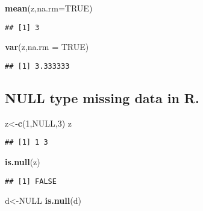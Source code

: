 \documentclass[
]{article}
\newenvironment{Shaded}{\begin{snugshade}}{\end{snugshade}}
\newcommand{\AttributeTok}[1]{\textcolor[rgb]{0.13,0.29,0.53}{#1}}
\newcommand{\ConstantTok}[1]{\textcolor[rgb]{0.56,0.35,0.01}{#1}}
\newcommand{\DecValTok}[1]{\textcolor[rgb]{0.00,0.00,0.81}{#1}}
\newcommand{\FunctionTok}[1]{\textcolor[rgb]{0.13,0.29,0.53}{\textbf{#1}}}
\newcommand{\NormalTok}[1]{#1}
\newcommand{\OtherTok}[1]{\textcolor[rgb]{0.56,0.35,0.01}{#1}}
\begin{document}
\begin{Shaded}
\begin{Highlighting}[]
\FunctionTok{mean}\NormalTok{(z,}\AttributeTok{na.rm=}\ConstantTok{TRUE}\NormalTok{)}
\end{Highlighting}
\end{Shaded}

\begin{verbatim}
## [1] 3
\end{verbatim}

\begin{Shaded}
\begin{Highlighting}[]
\FunctionTok{var}\NormalTok{(z,}\AttributeTok{na.rm =} \ConstantTok{TRUE}\NormalTok{)}
\end{Highlighting}
\end{Shaded}

\begin{verbatim}
## [1] 3.333333
\end{verbatim}

\subsection{NULL type missing data in
R.}\label{null-type-missing-data-in-r.}

\begin{Shaded}
\begin{Highlighting}[]
\NormalTok{z}\OtherTok{\textless{}{-}}\FunctionTok{c}\NormalTok{(}\DecValTok{1}\NormalTok{,}\ConstantTok{NULL}\NormalTok{,}\DecValTok{3}\NormalTok{)}
\NormalTok{z}
\end{Highlighting}
\end{Shaded}

\begin{verbatim}
## [1] 1 3
\end{verbatim}

\begin{Shaded}
\begin{Highlighting}[]
\FunctionTok{is.null}\NormalTok{(z)}
\end{Highlighting}
\end{Shaded}

\begin{verbatim}
## [1] FALSE
\end{verbatim}

\begin{Shaded}
\begin{Highlighting}[]
\NormalTok{d}\OtherTok{\textless{}{-}}\ConstantTok{NULL}
\FunctionTok{is.null}\NormalTok{(d)}
\end{Highlighting}
\end{Shaded}
\end{document}
